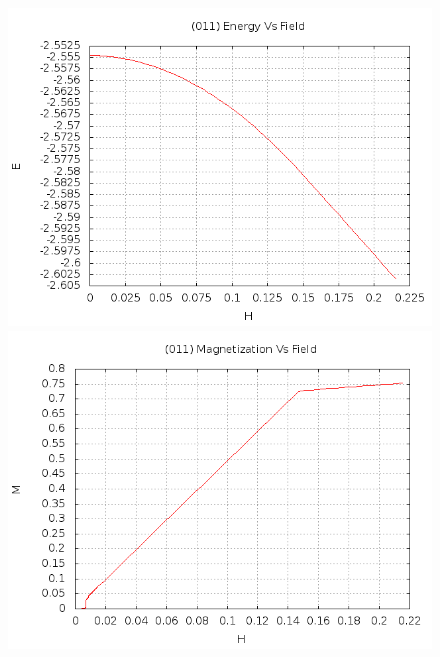 \documentclass{article}
\begin{document}
\begin{figure}[ht]
\centering
\includegraphics[scale=0.3]{HVariedData/Increasing/011Einc.png}
\includegraphics[scale=0.3]{HVariedData/Increasing/011Minc.png}
\end{figure}
\end{document}

